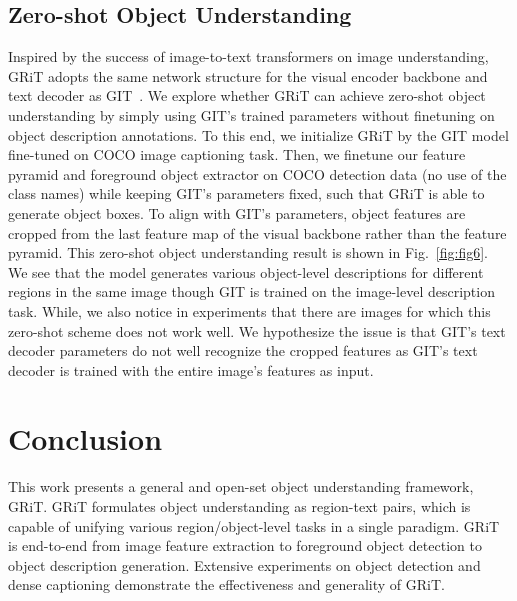\documentclass[10pt,twocolumn,letterpaper]{article}
\begin{document}
\subsection{Zero-shot Object Understanding}
Inspired by the success of image-to-text transformers on image understanding, GRiT adopts the same network structure for the visual encoder backbone and text decoder as GIT~\cite{wang2022git}. We explore whether GRiT can achieve zero-shot object understanding by simply using GIT's trained parameters without finetuning on object description annotations. To this end, we initialize GRiT by the GIT model fine-tuned on COCO image captioning task.
Then, we finetune our feature pyramid and foreground object extractor on COCO detection data (no use of the class names) while keeping GIT's parameters fixed, such that GRiT is able to generate object boxes. To align with GIT's parameters, object features are cropped from the last feature map of the visual backbone rather than the feature pyramid. This zero-shot object understanding result is shown in Fig.~\ref{fig:fig6}. We see that the model generates various object-level descriptions for different regions in the same image though GIT is trained on the image-level description task. While, we also notice in experiments that there are images for which this zero-shot scheme does not work well. We hypothesize the issue is that GIT's text decoder parameters do not well recognize the cropped features as GIT's text decoder is trained with the entire image's features as input. 

\section{Conclusion}
This work presents a general and open-set object understanding framework, GRiT. GRiT formulates object understanding as region-text pairs, which is capable of unifying various region/object-level tasks in a single paradigm. GRiT is end-to-end from image feature extraction to foreground object detection to object description generation. Extensive experiments on object detection and dense captioning demonstrate the effectiveness and generality of GRiT. 

{\small


}
\end{document}
